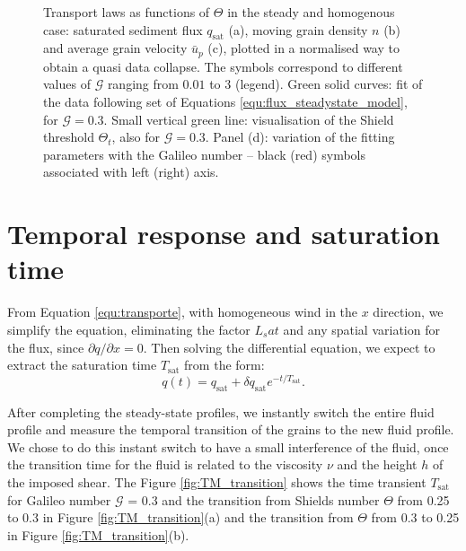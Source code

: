 \begin{figure}[H]
    \caption[Transport laws for viscous bedload transport.]{Transport laws as functions of $\Theta$ in the steady and homogenous case: saturated sediment flux $q_\textrm{sat}$ (a), moving grain density $n$ (b) and average grain velocity $\bar{u}_p$ (c), plotted in a normalised way to obtain a quasi data collapse. The symbols correspond to different values of $\mathcal{G}$ ranging from $0.01$ to $3$ (legend). Green solid curves: fit of the data following set of Equations \ref{equ:flux_steadystate_model}, for $\mathcal{G}=0.3$. Small vertical green line: visualisation of the Shield threshold $\Theta_t$, also for $\mathcal{G}=0.3$. Panel (d): variation of the fitting parameters with the Galileo number -- black (red) symbols associated with left (right) axis.}
    \label{fig:TM_profiles}
\end{figure}

\section{Temporal response and saturation time}
\label{sec:Tsat}
    From Equation \ref{equ:transporte}, with homogeneous wind in the $x$ direction, we simplify the equation, eliminating the factor $L_sat$ and any spatial variation for the flux, since $\partial q/\partial x = 0$. Then solving the differential equation, we expect to extract the saturation time $T_\textrm{sat}$ from the form:
\begin{equation}
    q(t) = q_\textrm{sat} + \delta q_\textrm{sat} e^{-t/T_\textrm{sat}}.
\end{equation}

    After completing the steady-state profiles, we instantly switch the entire fluid profile and measure the temporal transition of the grains to the new fluid profile. We chose to do this instant switch to have a small interference of the fluid, once the transition time for the fluid is related to the viscosity $\nu$ and the height $h$ of the imposed shear. The Figure \ref{fig:TM_transition} shows the time transient $T_\textrm{sat}$ for Galileo number $\mathcal{G}$ = 0.3 and the transition from Shields number $\Theta$ from 0.25 to 0.3 in Figure \ref{fig:TM_transition}(a) and the transition from $\Theta$ from 0.3 to 0.25 in Figure \ref{fig:TM_transition}(b).

